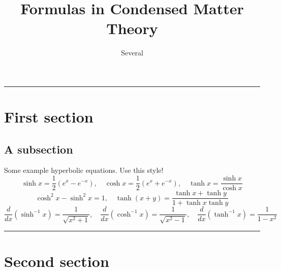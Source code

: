 \documentclass[12pt]{extarticle}
\title{Formulas in Condensed Matter Theory}
\author{Several}
\newcommand{\mysection}[1]{
\vspace{1mm}
\hrule
\section{\Huge{#1}}}
\begin{document}
\begin{center}
\end{center}

\begin{multicols*}{2}
\setlength{\columnseprule}{0.3pt}

\mysection{First section}
\subsection{A subsection}
Some example hyperbolic equations. Use this style!
$$\sinh x= \dfrac{1}{2} \left( e^{x} - e^{-x} \right), \quad \cosh x= \dfrac{1}{2} \left( e^{x} + e^{-x} \right), \quad \tanh x= \dfrac{\sinh x}{\cosh x}$$
$$\cosh ^2 x - \sinh ^2 x = 1, \quad \tanh (x+y) = \dfrac{\tanh x + \tanh y}{1+\tanh x \tanh y}$$
$$\dfrac{d}{dx}(\sinh^{-1} x)=\dfrac{1}{\sqrt{x^2+1}}, \quad \dfrac{d}{dx}(\cosh^{-1} x)=\dfrac{1}{\sqrt{x^2-1}}, \quad \dfrac{d}{dx}(\tanh^{-1} x)=\dfrac{1}{1-x^2}$$

\mysection{Second section}

\end{multicols*}
\end{document}
